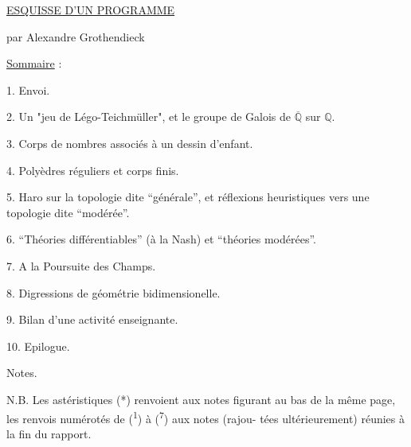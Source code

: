 \uline{ESQUISSE D'UN PROGRAMME}

par Alexandre Grothendieck

\uline{Sommaire} :

1. Envoi.

2. Un "jeu de Légo-Teichmüller", et le groupe de Galois de $\overline{\mathbb{Q}}$ sur $\mathbb{Q}$.

3. Corps de nombres associés à un dessin d'enfant.

4. Polyèdres réguliers et corps finis.

5. Haro sur la topologie dite ``générale'', et réflexions heuristiques
vers une topologie dite ``modérée''.

6. ``Théories différentiables'' (à la Nash) et ``théories modérées''.

7. A la Poursuite des Champs.

8. Digressions de géométrie bidimensionelle.

9. Bilan d'une activité enseignante.

10. Epilogue.

Notes.

N.B. Les astéristiques (*) renvoient aux notes figurant au bas de
la même page, les renvois numérotés de (\textsuperscript{1}) à (\textsuperscript{7}) aux notes (rajou-%
tées ultérieurement) réunies à la fin du rapport.

